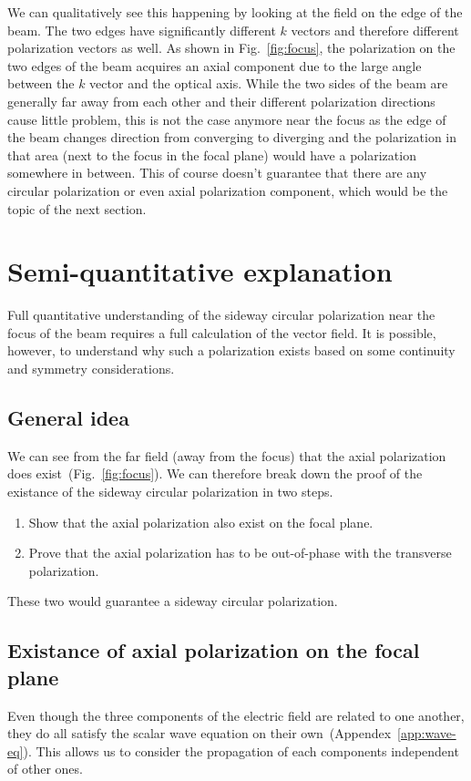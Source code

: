 \documentclass[10pt,fleqn]{article}
\begin{document}
We can qualitatively see this happening by looking at the field
on the edge of the beam.
The two edges have significantly different $k$ vectors
and therefore different polarization vectors as well.
As shown in Fig.~\ref{fig:focus}, the polarization on the two edges of the beam
acquires an axial component due to the large angle between the $k$ vector
and the optical axis. While the two sides of the beam are generally
far away from each other and their different polarization directions cause
little problem, this is not the case anymore near the focus as the edge of the beam
changes direction from converging to diverging and the polarization in that area
(next to the focus in the focal plane) would have a polarization somewhere in between.
This of course doesn't guarantee that there are any circular polarization
or even axial polarization component, which would be the topic of the next section.

\section{Semi-quantitative explanation}

Full quantitative understanding of the sideway circular polarization
near the focus of the beam requires a full calculation of the vector field.
It is possible, however, to understand why such a polarization exists
based on some continuity and symmetry considerations.

\subsection{General idea}
We can see from the far field (away from the focus)
that the axial polarization does exist~(Fig.~\ref{fig:focus}).
We can therefore break down the proof of the existance of
the sideway circular polarization in two steps.
\begin{enumerate}
\item Show that the axial polarization also exist on the focal plane.
\item Prove that the axial polarization has to be out-of-phase
  with the transverse polarization.
\end{enumerate}
These two would guarantee a sideway circular polarization.

\subsection{Existance of axial polarization on the focal plane}
\label{sec:semi:axial-pol}
Even though the three components of the electric field are related to one another,
they do all satisfy the scalar wave equation on their own~(Appendex~\ref{app:wave-eq}).
This allows us to consider the propagation of each components independent of other ones.
\end{document}
